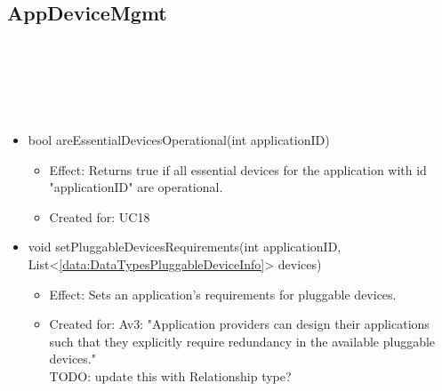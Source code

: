   \subsection{AppDeviceMgmt}\label{int:GatewayGatewayGatewayFacadeAppDeviceMgmt}
    \begin{description}
      \item[Provided by:] \iconcomponent{}~
      \item[Required by:] \iconcomponent{}~
      \item[Operations:] ~
    \begin{itemize}[noitemsep,nolistsep,leftmargin=-.25cm]
      \item \textsf{bool areEssentialDevicesOperational(int applicationID)}
        \begin{itemize}[noitemsep,nolistsep]
           \item Effect: Returns true if all essential devices for the application with id "applicationID" are operational.
\item Created for: UC18
        \end{itemize}
      \item \textsf{void setPluggableDevicesRequirements(int applicationID, List\textless{}\ref{data:DataTypesPluggableDeviceInfo}\textgreater{} devices)}
        \begin{itemize}[noitemsep,nolistsep]
           \item Effect: Sets an application's requirements for pluggable devices.
\item Created for: Av3: "Application providers can design their applications such that they explicitly require redundancy in the available pluggable devices." \\
TODO: update this with Relationship type?
        \end{itemize}
    \end{itemize}
    \end{description}

